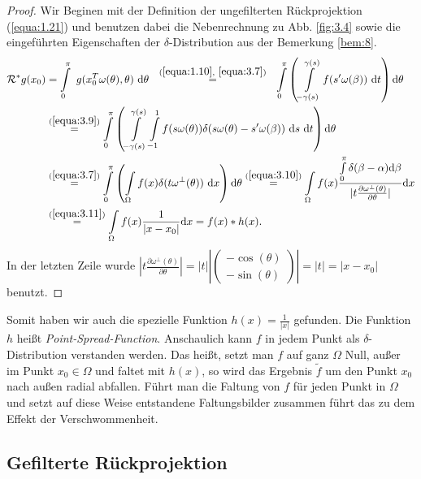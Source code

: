 \begin{proof}
	Wir Beginen mit der Definition der ungefilterten Rückprojektion (\ref{equa:1.21}) und benutzen dabei die Nebenrechnung zu Abb. \ref{fig:3.4} sowie die eingeführten Eigenschaften der $\delta$-Distribution aus der Bemerkung \ref{bem:8}.
	\begin{equation}
	\begin{split}
		\mathcal{R^*} g(x_0) & = \int\limits_{0}^{\pi} \ g(x_{0}^{T}\omega(\theta),\theta) \ \mbox{d}\theta  \ \  \stackrel{(\ref{equa:1.10}, \ \ref{equa:3.7})}{=} \ \ \int\limits_{0}^{\pi} \left( \int\limits_{-\gamma(s)}^{\gamma(s)} f(s'\omega(\beta)) \ \mbox{d}t \right) \mbox{d}\theta \\
		& \stackrel{(\ref{equa:3.9})}{=} \int\limits_{0}^{\pi} \left( \int\limits_{-\gamma(s)}^{\gamma(s)} \int\limits_{-1}^{1} f(s\omega(\theta)) \delta(s\omega(\theta) - s'\omega(\beta)) \ \mbox{d}s \ \mbox{d}t \right) \mbox{d}\theta \\
		& \stackrel{(\ref{equa:3.7})}{=} \int\limits_{0}^{\pi} \left( \int\limits_{\Omega} f(x) \delta(t\omega^{\perp}(\theta)) \ \mbox{d}x \right) \mbox{d}\theta \stackrel{(\ref{equa:3.10})}{=} \int\limits_{\Omega} f(x) \frac{\int\limits_{0}^{\pi}\delta(\beta - \alpha)\mbox{d}\beta}{|t\frac{\partial \omega^{\perp}(\theta)}{\partial \theta}|} \mbox{d}x \\
		& \stackrel{(\ref{equa:3.11})}{=} \int\limits_{\Omega} f(x) \frac{1}{|x - x_0|} \mbox{d}x = f(x)*h(x).
	\end{split}
	\label{equa:3.12}
	\end{equation}
	In der letzten Zeile wurde $|t\frac{\partial \omega^{\perp}(\theta)}{\partial \theta}| = |t||\left(\begin{array}{c} -\cos(\theta) \\ -\sin(\theta) \end{array}\right)| = |t| = |x -x_0|$ benutzt.
\end{proof}
Somit haben wir auch die spezielle Funktion $h(x) = \frac{1}{|x|}$ gefunden. Die Funktion $h$ heißt \textit{Point-Spread-Function}. Anschaulich kann $f$ in jedem Punkt als $\delta$-Distribution verstanden werden. Das heißt, setzt man $f$ auf ganz $\Omega$ Null, außer im Punkt $x_0 \in \Omega$ und faltet mit $h(x)$, so wird das Ergebnis $\tilde{f}$ um den Punkt $x_0$ nach außen radial abfallen. Führt man die Faltung von $f$ für jeden Punkt in $\Omega$ und setzt auf diese Weise entstandene Faltungsbilder zusammen führt das zu dem Effekt der Verschwommenheit. 

\subsection*{Gefilterte Rückprojektion}
\label{cha:3.1.2}

